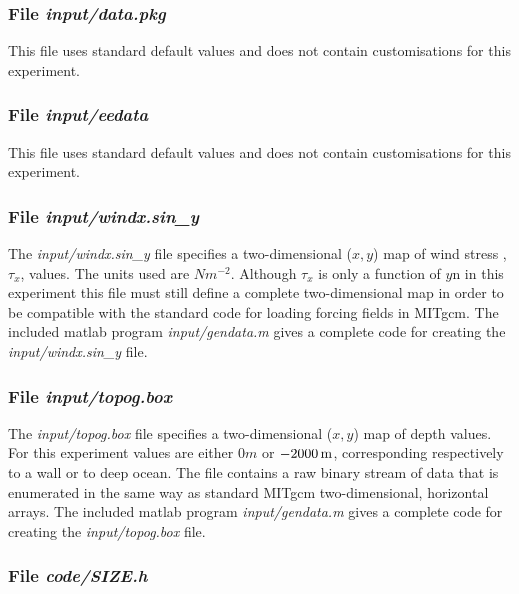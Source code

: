 \begin{small}

\end{small}

\subsubsection{File {\it input/data.pkg}}
\label{www:tutorials}

This file uses standard default values and does not contain
customisations for this experiment.

\subsubsection{File {\it input/eedata}}
\label{www:tutorials}

This file uses standard default values and does not contain
customisations for this experiment.

\subsubsection{File {\it input/windx.sin\_y}}
\label{www:tutorials}

The {\it input/windx.sin\_y} file specifies a two-dimensional ($x,y$) 
map of wind stress ,$\tau_{x}$, values. The units used are $Nm^{-2}$.
Although $\tau_{x}$ is only a function of $y$n in this experiment
this file must still define a complete two-dimensional map in order
to be compatible with the standard code for loading forcing fields 
in MITgcm. The included matlab program {\it input/gendata.m} gives a complete
code for creating the {\it input/windx.sin\_y} file.

\subsubsection{File {\it input/topog.box}}
\label{www:tutorials}


The {\it input/topog.box} file specifies a two-dimensional ($x,y$) 
map of depth values. For this experiment values are either
$0m$ or $-2000\,{\rm m}$, corresponding respectively to a wall or to deep
ocean. The file contains a raw binary stream of data that is enumerated
in the same way as standard MITgcm two-dimensional, horizontal arrays.
The included matlab program {\it input/gendata.m} gives a complete
code for creating the {\it input/topog.box} file.

\subsubsection{File {\it code/SIZE.h}}
\label{www:tutorials}

